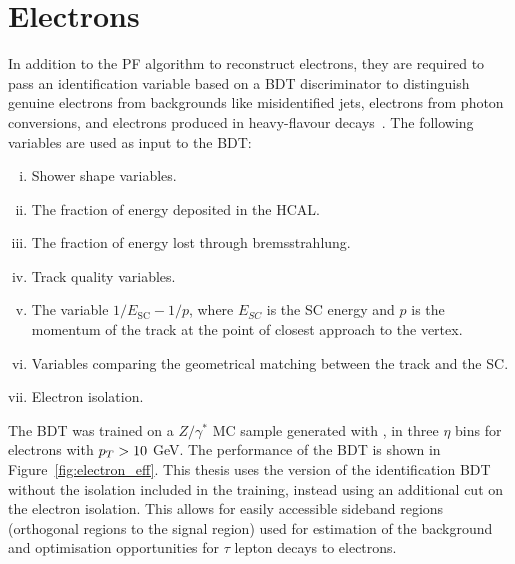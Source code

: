\section{Electrons}

In addition to the \ac{PF} algorithm to reconstruct electrons, they are required to pass an identification variable based on a \ac{BDT} discriminator to distinguish genuine electrons from backgrounds like misidentified jets, electrons from photon conversions, and electrons produced in heavy-flavour decays~\cite{CMS:2015xaf}.
The following variables are used as input to the \ac{BDT}:

\begin{enumerate}[i)]
\item Shower shape variables.
\item The fraction of energy deposited in the \ac{HCAL}.
\item The fraction of energy lost through bremsstrahlung.
\item Track quality variables.
\item The variable $1/E_{\text{SC}} - 1/p$, where $E_{SC}$ is the \ac{SC} energy and $p$ is the momentum of the track at the point of closest approach to the vertex.
\item Variables comparing the geometrical matching between the track and the \ac{SC}.
\item Electron isolation.
\end{enumerate}

The \ac{BDT} was trained on a $Z/\gamma^{*}$ \ac{MC} sample generated with \MADGRAPH, in three $\eta$ bins for electrons with $p_{T}>10$ GeV.
The performance of the \ac{BDT} is shown in Figure~\ref{fig:electron_eff}.
This thesis uses the version of the identification \ac{BDT} without the isolation included in the training, instead using an additional cut on the electron isolation. 
This allows for easily accessible sideband regions (orthogonal regions to the signal region) used for estimation of the background and optimisation opportunities for $\tau$ lepton decays to electrons. \\

